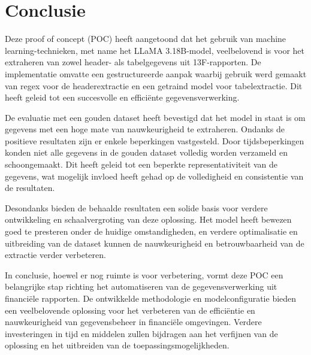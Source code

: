 \section{Conclusie}
Deze proof of concept (POC) heeft aangetoond dat het gebruik van machine learning-technieken, met name het LLaMA 3.18B-model, veelbelovend is voor het extraheren van zowel header- als tabelgegevens uit 13F-rapporten. De implementatie omvatte een gestructureerde aanpak waarbij gebruik werd gemaakt van regex voor de headerextractie en een getraind model voor tabelextractie. Dit heeft geleid tot een succesvolle en efficiënte gegevensverwerking.

De evaluatie met een gouden dataset heeft bevestigd dat het model in staat is om gegevens met een hoge mate van nauwkeurigheid te extraheren. Ondanks de positieve resultaten zijn er enkele beperkingen vastgesteld. Door tijdsbeperkingen konden niet alle gegevens in de gouden dataset volledig worden verzameld en schoongemaakt. Dit heeft geleid tot een beperkte representativiteit van de gegevens, wat mogelijk invloed heeft gehad op de volledigheid en consistentie van de resultaten.

Desondanks bieden de behaalde resultaten een solide basis voor verdere ontwikkeling en schaalvergroting van deze oplossing. Het model heeft bewezen goed te presteren onder de huidige omstandigheden, en verdere optimalisatie en uitbreiding van de dataset kunnen de nauwkeurigheid en betrouwbaarheid van de extractie verder verbeteren.

In conclusie, hoewel er nog ruimte is voor verbetering, vormt deze POC een belangrijke stap richting het automatiseren van de gegevensverwerking uit financiële rapporten. De ontwikkelde methodologie en modelconfiguratie bieden een veelbelovende oplossing voor het verbeteren van de efficiëntie en nauwkeurigheid van gegevensbeheer in financiële omgevingen. Verdere investeringen in tijd en middelen zullen bijdragen aan het verfijnen van de oplossing en het uitbreiden van de toepassingsmogelijkheden.






